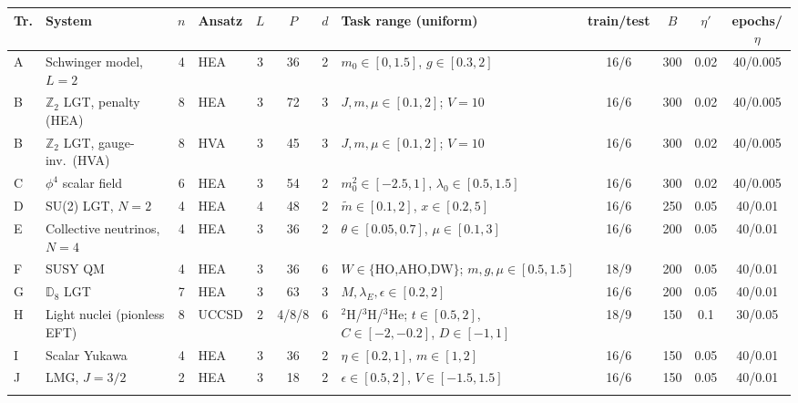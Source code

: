 \setlength{\tabcolsep}{3pt}\begin{tabular}{@{}l>{\raggedright\arraybackslash}p{2.1cm}clccc>{\raggedright\arraybackslash}p{3.0cm}cccc@{}}
\toprule
Tr. & System & $n$ & Ansatz & $L$ & $P$ & $d$ & Task range (uniform) & train/test & $B$ & $\eta'$ & epochs/$\eta$ \\
\midrule
A & Schwinger model, $L{=}2$ & 4 & HEA & 3 & 36 & 2 & $m_0\in[0,1.5]$, $g\in[0.3,2]$ & 16/6 & 300 & 0.02 & 40/0.005 \\[2pt]
B & $\mathbb{Z}_2$ LGT, penalty (HEA) & 8 & HEA & 3 & 72 & 3 & $J,m,\mu\in[0.1,2]$; $V{=}10$ & 16/6 & 300 & 0.02 & 40/0.005 \\[2pt]
B & $\mathbb{Z}_2$ LGT, gauge-inv.\ (HVA) & 8 & HVA & 3 & 45 & 3 & $J,m,\mu\in[0.1,2]$; $V{=}10$ & 16/6 & 300 & 0.02 & 40/0.005 \\[2pt]
C & $\phi^4$ scalar field & 6 & HEA & 3 & 54 & 2 & $m_0^2\in[-2.5,1]$, $\lambda_0\in[0.5,1.5]$ & 16/6 & 300 & 0.02 & 40/0.005 \\[2pt]
D & SU(2) LGT, $N{=}2$ & 4 & HEA & 4 & 48 & 2 & $\tilde m\in[0.1,2]$, $x\in[0.2,5]$ & 16/6 & 250 & 0.05 & 40/0.01 \\[2pt]
E & Collective neutrinos, $N{=}4$ & 4 & HEA & 3 & 36 & 2 & $\theta\in[0.05,0.7]$, $\mu\in[0.1,3]$ & 16/6 & 200 & 0.05 & 40/0.01 \\[2pt]
F & SUSY QM & 4 & HEA & 3 & 36 & 6 & $W\in\{$HO,AHO,DW$\}$; $m,g,\mu\in[0.5,1.5]$ & 18/9 & 200 & 0.05 & 40/0.01 \\[2pt]
G & $\mathbb{D}_8$ LGT & 7 & HEA & 3 & 63 & 3 & $M,\lambda_E,\epsilon\in[0.2,2]$ & 16/6 & 200 & 0.05 & 40/0.01 \\[2pt]
H & Light nuclei (pionless EFT) & 8 & UCCSD & 2 & 4/8/8 & 6 & $^2$H/$^3$H/$^3$He; $t\in[0.5,2]$, $C\in[-2,-0.2]$, $D\in[-1,1]$ & 18/9 & 150 & 0.1 & 30/0.05 \\[2pt]
I & Scalar Yukawa & 4 & HEA & 3 & 36 & 2 & $\eta\in[0.2,1]$, $m\in[1,2]$ & 16/6 & 150 & 0.05 & 40/0.01 \\[2pt]
J & LMG, $J{=}3/2$ & 2 & HEA & 3 & 18 & 2 & $\epsilon\in[0.5,2]$, $V\in[-1.5,1.5]$ & 16/6 & 150 & 0.05 & 40/0.01 \\[2pt]
\botrule
\end{tabular}
